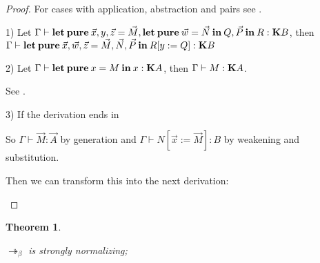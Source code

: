 \documentclass[a4paper]{article}
\newtheorem{theorem}{Theorem}
\begin{document}
\begin{proof}
For cases with application, abstraction and pairs see \cite{Morten} \cite{Pierce}.

1)
  Let $\Gamma \vdash {\bf let \: pure \:} \vec{x}, y, \vec{z} = \vec{M}, {\bf let \: pure \: } \vec{w} = \vec{N} {\bf \: in \: } Q, \vec{P}  {\: \bf in \:} R : {\bf K}B$,
  then $\Gamma \vdash {\bf let \: pure \:} \vec{x}, \vec{w}, \vec{z} = \vec{M}, \vec{N}, \vec{P} \: { \bf in } \: R [y := Q] : {\bf K}B$

2) Let $\Gamma \vdash {\bf let \: pure \:} x = M {\: \bf in \: } x : {\bf K}A$, then $\Gamma \vdash M : {\bf K}A$.

See \cite{ModalK}.

3) If the derivation ends in

\begin{prooftree}
\end{prooftree}

So $\Gamma \vdash \vec{M} : \vec{A}$ by generation and $\Gamma \vdash N [\vec{x} := \vec{M}] : B$ by weakening and substitution.

Then we can transform this into the next derivation:

\begin{prooftree}
\end{prooftree}


\end{proof}

\begin{theorem}
  $ $

  $\twoheadrightarrow_{\beta}$ is strongly normalizing;
\end{theorem}
\end{document}
